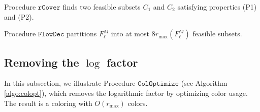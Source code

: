\documentclass[a4paper,UKenglish]{lipics-v2016}
\theoremstyle{plain}
\newcommand{\rmax}{r_{\max}}
\newcommand{\cmax}{c_{\max}}
\begin{document}




\begin{lemma}\label{lem:rcover}
Procedure $\mathtt{rCover}$ finds two feasible subsets $C_1$ and $C_2$ satisfying properties (P1) and (P2).
\end{lemma}

\begin{lemma}
\label{classschedule}
Procedure $\mathtt{FlowDec}$ partitions $F^M_\ell$ into at most $8 \rmax(F^M_\ell)$ feasible subsets.
\end{lemma}

\subsection{Removing the $\log$ factor}
\label{subsec: unify colors}
In this subsection, we illustrate Procedure $\mathtt{ColOptimize}$ (see Algorithm \ref{algo:colopt}), which removes the logarithmic factor by optimizing color usage. The result is a coloring with $O(r_{\max})$ colors.
\end{document}
